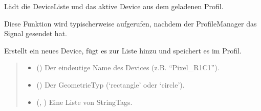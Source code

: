\documentclass[letterpaper,10pt,english]{sphinxmanual}
\begin{document}
\begin{fulllineitems}
\begin{fulllineitems}
\label{\detokenize{modulab/device_manager:modules.device.DeviceManager.DeviceManager.load_from_profile}}
\pysigstartsignatures
\pysiglinewithargsret
{}
{}
{}
\pysigstopsignatures
\sphinxAtStartPar
Lädt die Device\sphinxhyphen{}Liste und das aktive Device aus dem geladenen Profil.

\sphinxAtStartPar
Diese Funktion wird typischerweise aufgerufen, nachdem der
ProfileManager das \sphinxhyphen{}Signal gesendet hat.

\end{fulllineitems}


\begin{fulllineitems}
\label{\detokenize{modulab/device_manager:modules.device.DeviceManager.DeviceManager.create_device}}
\pysigstartsignatures
\pysiglinewithargsret
{}
{\sphinxparamcomma {}\sphinxparamcomma {}\sphinxparamcomma {}}
{}
\pysigstopsignatures
\sphinxAtStartPar
Erstellt ein neues Device, fügt es zur Liste hinzu und speichert es im Profil.
\begin{quote}\begin{description}
\begin{itemize}
\item {} 
\sphinxAtStartPar
{} () \textendash{} Der eindeutige Name des Devices (z.B. “Pixel\_R1C1”).

\item {} 
\sphinxAtStartPar
{} () \textendash{} Der Geometrie\sphinxhyphen{}Typ (‘rectangle’ oder ‘circle’).

\item {} 
\sphinxAtStartPar
{} (, ) \textendash{} Eine Liste von String\sphinxhyphen{}Tags.


\end{itemize}
\end{description}
\end{quote}
\end{fulllineitems}
\end{fulllineitems}
\end{document}

